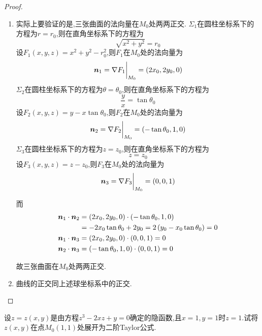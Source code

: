 \begin{proof}
    \begin{enumerate}
        \item 实际上要验证的是,三张曲面的法向量在$M_0$处两两正交.
        $\Sigma_1$在圆柱坐标系下的方程为$r = r_0$,则在直角坐标系下的方程为
        $$\sqrt{x^2 + y^2} = r_0$$
        设$F_1(x,y,z) = x^2 + y^2 - r_0^2$,则$F_1$在$M_0$处的法向量为
        $$\bm{n}_1 = \nabla F_1 \bigg|_{M_0} = \left( 2x_0, 2y_0, 0 \right)$$
        $\Sigma_2$在圆柱坐标系下的方程为$\theta = \theta_0$,则在直角坐标系下的方程为
        $$\frac{y}{x} = \tan \theta_0$$
        设$F_2(x,y,z) = y - x \tan \theta_0$,则$F_2$在$M_0$处的法向量为
        $$\bm{n}_2 = \nabla F_2 \bigg|_{M_0} = \left( -\tan \theta_0, 1, 0 \right)$$
        $\Sigma_3$在圆柱坐标系下的方程为$z = z_0$,则在直角坐标系下的方程为
        $$z = z_0$$
        设$F_3(x,y,z) = z - z_0$,则$F_3$在$M_0$处的法向量为
        $$\bm{n}_3 = \nabla F_3 \bigg|_{M_0} = \left( 0, 0, 1 \right)$$

        而
        \begin{align*}
            \bm{n}_1 \cdot \bm{n}_2 &= \left( 2x_0, 2y_0, 0 \right) \cdot \left( -\tan \theta_0, 1, 0 \right)\\
            &= -2x_0 \tan \theta_0 + 2y_0 = 2\left( y_0 - x_0 \tan \theta_0 \right) = 0\\
            \bm{n}_1 \cdot \bm{n}_3 &= \left( 2x_0, 2y_0, 0 \right) \cdot (0, 0, 1) = 0\\
            \bm{n}_2 \cdot \bm{n}_3 &= (-\tan \theta_0, 1, 0) \cdot (0, 0, 1) = 0
        \end{align*}

        故三张曲面在$M_0$处两两正交.
        \item 曲线的正交同上述球坐标系中的正交.
    \end{enumerate}
\end{proof}

\begin{example}
    设$z = z(x,y)$是由方程$z^3 -2xz + y = 0$确定的隐函数,且$x=1,y=1$时$z = 1$.试将$z(x,y)$在点$M_0(1,1)$处展开为二阶Taylor公式.
\end{example}

